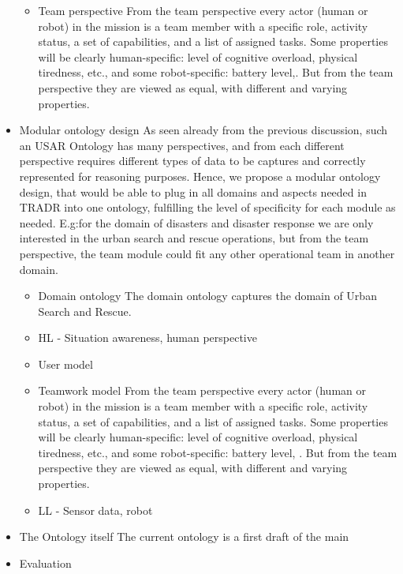 \begin{itemize}
\begin{itemize}
\item Team perspective
From the team perspective every actor (human or robot) in the mission is a team member with a specific role, activity status, a set of capabilities, and a list of assigned tasks. Some properties will be clearly human-specific: level of cognitive overload, physical tiredness, etc., and some robot-specific: battery level,. But from the team perspective they are viewed as equal, with different and varying properties.  

\end{itemize}


\item Modular ontology design
As seen already from the previous discussion, such an USAR Ontology has many perspectives, and from each different perspective requires different types of data to be captures and correctly represented for reasoning purposes. Hence, we propose a modular ontology design, that would be able to plug in all domains and aspects needed in TRADR into one ontology, fulfilling the level of specificity for each module as needed. E.g:for the domain of disasters and disaster response we are only interested in the urban search and rescue operations, but from the team perspective, the team module could fit any other operational team in another domain.


\begin{itemize}
\item Domain ontology
The domain ontology captures the domain of Urban Search and Rescue.
\item HL - Situation awareness, human perspective
\item User model
\item Teamwork model
From the team perspective every actor (human or robot) in the mission is a team member with a specific role, activity status, a set of capabilities, and a list of assigned tasks. Some properties will be clearly human-specific: level of cognitive overload, physical tiredness, etc., and some robot-specific: battery level, . But from the team perspective they are viewed as equal, with different and varying properties.  

\item LL - Sensor data, robot
\end{itemize}


\item The Ontology itself
The current ontology is a first draft of the main 
\item Evaluation


\end{itemize}
  
  
  
  
  
  
  
  
  
  
  
  
  
  
  